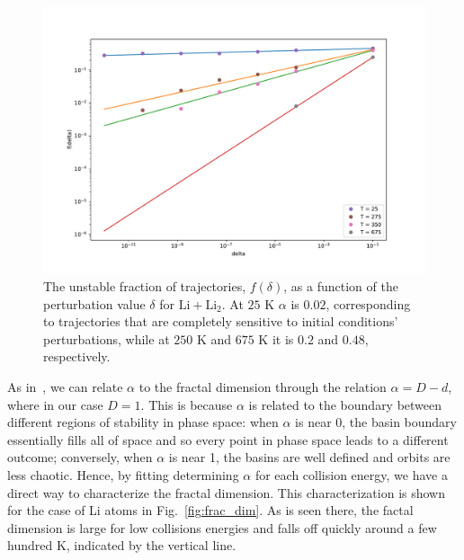 \documentclass[%
 reprint,
 amsmath,amssymb,
 aps,
 nofootinbib
]{revtex4-1}
\begin{document}
\begin{figure}[ht]
\begin{center}
\includegraphics[width=1.125\linewidth]{uncertainty.pdf}
\caption{The unstable fraction of trajectories, $f(\delta)$, as a function of the perturbation value $\delta$ for $\mathrm{Li} + \mathrm{Li_2}$. At $25$ K $\alpha$ is $0.02$, corresponding to trajectories that are completely sensitive to initial conditions' perturbations, while at $250$ K and $675$ K it is $0.2$ and $0.48$, respectively.}
\label{fig:unc}
\end{center}
\end{figure}

As in~\cite{bohn2014,mcdonald1985}, we can relate $\alpha$ to the fractal dimension through the relation $\alpha = D-d$, where in our case $D = 1$. This is because $\alpha$ is related to the boundary between different regions of stability in phase space: when $\alpha$ is near 0, the basin boundary essentially fills all of space and so every point in phase space leads to a different outcome; conversely, when $\alpha$ is near 1, the basins are well defined and orbits are less chaotic. Hence, by fitting determining $\alpha$ for each collision energy, we have a direct way to characterize the fractal dimension. This characterization is shown for the case of Li atoms in Fig.~\ref{fig:frac_dim}. As is seen there, the factal dimension is large for low collisions energies and falls off quickly around a few hundred K, indicated by the vertical line.
\end{document}
